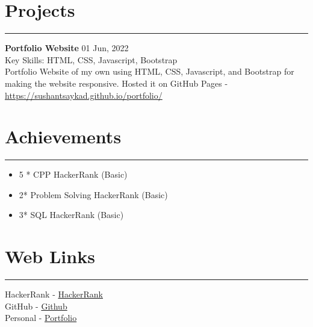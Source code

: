 \documentclass[a4paper,11pt]{article}
\begin{document}
\section*{Projects}
\vspace{-0.2cm}
\hrule
\vspace{0.2cm}
\textbf{Portfolio Website} \hfill 01 Jun, 2022\\
Key Skills: HTML, CSS, Javascript, Bootstrap\\
Portfolio Website of my own using HTML, CSS, Javascript, and Bootstrap for making the website responsive. Hosted it on GitHub Pages - \href{https://sushantsaykad.github.io/portfolio/}{https://sushantsaykad.github.io/portfolio/}

\section*{Achievements}
\vspace{-0.2cm}
\hrule
\vspace{0.2cm}
\begin{itemize}
    \item 5 * CPP HackerRank (Basic)
    \item 2* Problem Solving HackerRank (Basic)
    \item 3* SQL HackerRank (Basic)
\end{itemize}

\section*{Web Links}
\vspace{-0.2cm}
\hrule
\vspace{0.2cm}
HackerRank - \href{https://www.hackerrank.com/sushant_saykad}{HackerRank}\\
GitHub - \href{https://github.com/SushantSaykad}{Github}\\
Personal - \href{https://sushantsaykad.github.io/portfolio/}{Portfolio}
\end{document}
